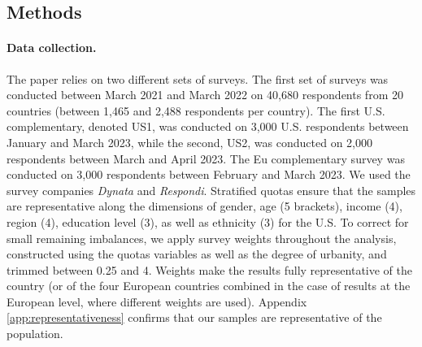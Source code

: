 \begin{small} %
\section*{\normalsize Methods}\label{sec:methods} %
\paragraph{\small Data collection.} %
The paper relies on two different sets of surveys. The first set of surveys was conducted between March 2021 and March 2022 on 40,680 respondents from 20 countries  (between 1,465 and 2,488 respondents per country). The first U.S. complementary, denoted US1, was conducted on 3,000 U.S. respondents between January and March 2023, while the second, US2, was conducted on 2,000 respondents between March and April 2023. The Eu complementary survey was conducted on 3,000 respondents between February and March 2023. %
We used the survey companies \emph{Dynata} and \emph{Respondi}. Stratified quotas ensure that the samples are representative along the dimensions of gender, age (5 brackets), income (4), region (4), education level (3), as well as ethnicity (3) for the U.S. %
To correct for small remaining imbalances, we apply survey weights throughout the analysis, constructed using the quotas variables as well as the degree of urbanity, and trimmed between 0.25 and 4. Weights make the results fully representative of the country (or of the four European countries combined in the case of results at the European level, where different weights are used). %
Appendix \ref{app:representativeness} confirms that our samples are representative of the population.


\end{small}
